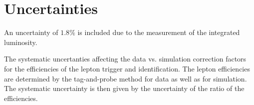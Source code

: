 \section{Uncertainties}

An uncertainty of $1.8\%$ is included due to the measurement of
the integrated luminosity.

The systematic uncertanties affecting the data vs. simulation correction factors
for the efficiencies of the lepton trigger and identification. The lepton
efficiencies are determined by the tag-and-probe method for data as well as for
simulation. The systematic uncertainty is then given by the uncertainty of
the ratio of the efficiencies.





